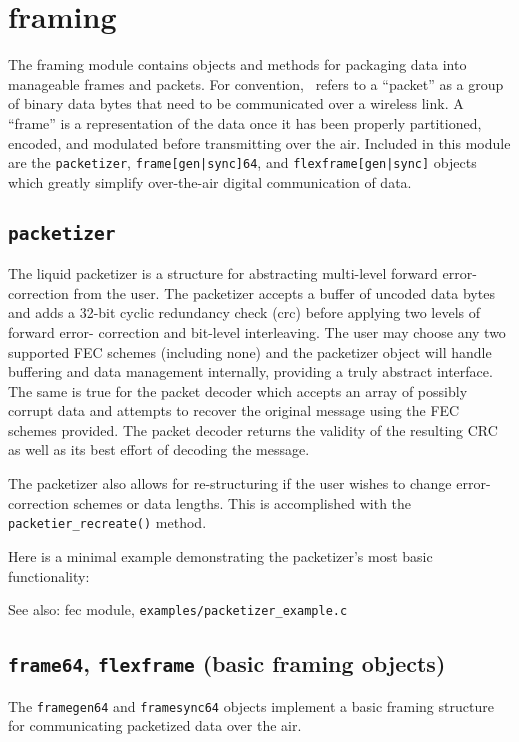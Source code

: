 % 
%

\section{framing}
\label{module:framing}
The framing module contains objects and methods for packaging data into
manageable frames and packets.
For convention, \liquid\ refers to a ``packet'' as a group of binary
data bytes that need to be communicated over a wireless link.
A ``frame'' is a representation of the data once it has been properly
partitioned, encoded, and modulated before transmitting over the air.
Included in this module are the {\tt packetizer}, 
{\tt frame[gen|sync]64}, and {\tt flexframe[gen|sync]} objects which
greatly simplify over-the-air digital communication of data.

\subsection{{\tt packetizer}}
\label{module:framing:packetizer}

The liquid packetizer is a structure for abstracting multi-level forward
error-correction from the user.
The packetizer accepts a buffer of uncoded data bytes and adds a 32-bit
cyclic redundancy check (crc) before applying two levels of forward error-
correction and bit-level interleaving.  The user may choose any two 
supported FEC schemes (including none) and the packetizer object will
handle buffering and data management internally, providing a truly abstract
interface.  The same is true for the packet decoder which accepts an array
of possibly corrupt data and attempts to recover the original message using
the FEC schemes provided.  The packet decoder returns the validity of the
resulting CRC as well as its best effort of decoding the message.

The packetizer also allows for re-structuring if the user wishes to change
error-correction schemes or data lengths.  This is accomplished with the
{\tt packetier\_recreate()} method.

Here is a minimal example demonstrating the packetizer's most basic
functionality:


See also: fec module, {\tt examples/packetizer\_example.c}

\subsection{{\tt frame64}, {\tt flexframe} (basic framing objects)}
\label{module:framing:frame}
The {\tt framegen64} and {\tt framesync64} objects implement a basic framing
structure for communicating packetized data over the air.

